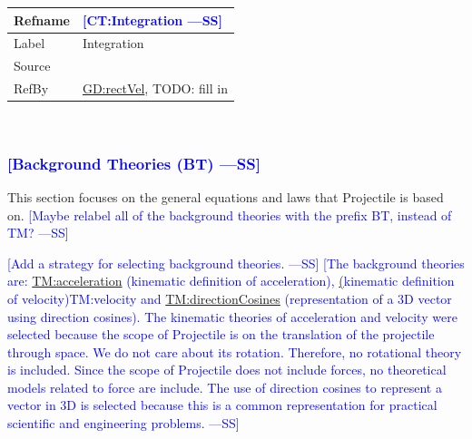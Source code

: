 \documentclass[12pt]{article}
\newcommand{\authornote}[3]{\textcolor{#1}{[#3 ---#2]}}
\newcommand{\authornote}[3]{}
\newcommand{\wss}[1]{\authornote{blue}{SS}{#1}}
\begin{document}
\medskip
\noindent
\begin{minipage}{\textwidth}
\begin{tabular}{>{\raggedright}p{}>{\raggedright\arraybackslash}p{}}
\toprule \textbf{Refname} & \textbf{\wss{CT:Integration}}
\label{CT:Integration}
\\ \midrule
Label & Integration
\\ \midrule
Source & \cite{}
\\ \midrule
RefBy & \hyperref[GD:rectVel]{GD:rectVel}, TODO: fill in
\\ \bottomrule
\end{tabular}
\end{minipage}
~\\

\subsubsection{\wss{Background Theories (BT)}}
\label{Sec:TMs}
This section focuses on the general equations and laws that Projectile is based
on.  \wss{Maybe relabel all of the background theories with the prefix BT,
instead of TM?}

\wss{Add a strategy for selecting background theories.}  \wss{The background
theories are: \hyperref[TM:acceleration]{TM:acceleration} (kinematic definition of
acceleration), \hyperref[TM:velocity] (kinematic definition of
velocity){TM:velocity} and \hyperref[TM:directionCosines]{TM:directionCosines}
(representation of a 3D vector using direction cosines).  The kinematic theories
of acceleration and velocity were selected because the scope of Projectile is on
the translation of the projectile through space.  We do not care about its
rotation.  Therefore, no rotational theory is included.  Since the scope of
Projectile does not include forces, no theoretical models related to force are
include.  The use of direction cosines to represent a vector in 3D is selected
because this is a common representation for practical scientific and engineering
problems.}
\end{document}
